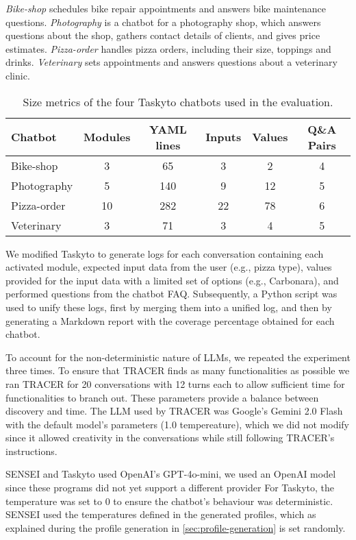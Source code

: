 \textit{Bike-shop} schedules bike repair appointments
and answers bike maintenance questions.
\textit{Photography} is a chatbot for a photography shop,
which answers questions about the shop,
gathers contact details of clients, and gives price estimates.
\textit{Pizza-order} handles pizza orders,
including their size, toppings and drinks.
\textit{Veterinary} sets appointments and answers questions about a veterinary clinic.

\begin{table}[htpb]
\centering
\caption{Size metrics of the four Taskyto chatbots used in the evaluation.}
\label{tab:rq1_chatbots}
\begin{tabular}{@{}lccccc@{}}
\toprule
\textbf{Chatbot} & \textbf{Modules} & \textbf{YAML lines} & \textbf{Inputs} & \textbf{Values} & \textbf{Q\&A Pairs} \\ \midrule
Bike-shop & 3 & 65 & 3 & 2 & 4 \\
Photography & 5 & 140 & 9 & 12 & 5 \\
Pizza-order & 10 & 282 & 22 & 78 & 6 \\
Veterinary & 3 & 71 & 3 & 4 & 5 \\ \bottomrule
\end{tabular}
\end{table}

We modified Taskyto to generate logs
for each conversation containing
each activated module,
expected input data from the user (e.g., pizza type),
values provided for the input data with a limited set of options (e.g., Carbonara),
and performed questions from the chatbot FAQ.
Subsequently, a Python script was used to unify these logs,
first by merging them into a unified log,
and then by generating a Markdown report
with the coverage percentage obtained for each chatbot.

To account for the non-deterministic nature of \acp{LLM},
we repeated the experiment three times.
To ensure that \ac{TRACER} finds as many functionalities as possible
we ran TRACER for 20 conversations with 12 turns each
to allow sufficient time for functionalities to branch out.
These parameters provide a balance between discovery and time.
The \ac{LLM} used by \ac{TRACER} was Google's Gemini 2.0 Flash
with the default model's parameters (1.0 tempereature),
which we did not modify since it allowed creativity in the conversations
while still following \ac{TRACER}'s instructions.

SENSEI and Taskyto used OpenAI's GPT-4o-mini,
we used an OpenAI model
since these programs did not yet support a different provider
For Taskyto, the temperature was set to 0
to ensure the chatbot's behaviour was deterministic.
SENSEI used the temperatures defined in the generated profiles,
which as explained during the profile generation in \autoref{sec:profile-generation}
is set randomly.

